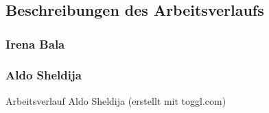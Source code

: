 \chapter{\docname}

\label{\docname}
\section{Beschreibungen des Arbeitsverlaufs}
\subsection{Irena Bala}



\subsection{Aldo Sheldija}


\caption{Arbeitsverlauf Aldo Sheldija (erstellt mit toggl.com)}
\label{tb:aldo_arbeitsverlauf}